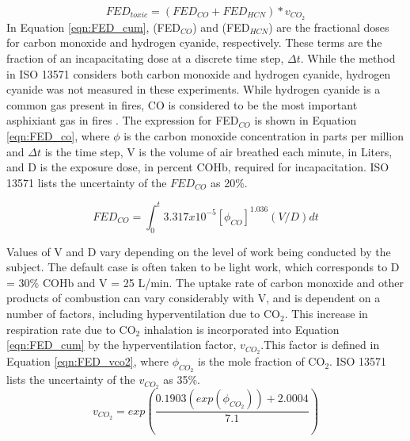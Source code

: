 \documentclass[12pt,oneside]{article}
\begin{document}
\begin{equation}\label{eqn:FED_cum}FED_{toxic}=(FED_{CO}+FED_{HCN})*v_{CO_2}\end{equation}
In Equation \ref{eqn:FED_cum},  (FED$_{CO}$) and  (FED$_{HCN}$) are the fractional doses for carbon monoxide and hydrogen cyanide, respectively. These terms are the fraction of an incapacitating dose at a discrete time step, $\Delta t$. While the method in ISO 13571 considers both carbon monoxide and hydrogen cyanide, hydrogen cyanide was not measured in these experiments. While hydrogen cyanide is a common gas present in fires, CO is considered to be the most important asphixiant gas in fires \cite{SFPE:Purser}. The expression for FED$_{CO}$ is shown in Equation \ref{eqn:FED_co}, where $\phi$ is the carbon monoxide concentration in parts per million and $\Delta t $ is the time step, V is the volume of air breathed each minute, in Liters, and D is the exposure dose, in percent COHb, required for incapacitation. ISO 13571 \cite{ISO13571} lists the uncertainty of the $FED_{CO}$ as 20\%.

\begin{equation}\label{eqn:FED_co}FED_{CO} = \int_{0}^{t} 3.317 x 10^{-5} [\phi_{CO}]^{1.036}(V/D)dt\end{equation}

Values of V and D vary depending on the level of work being conducted by the subject. The default case is often taken to be light work, which corresponds to D = 30\% COHb and V = 25 L/min. The uptake rate of carbon monoxide and other products of combustion can vary considerably with V, and is dependent on a number of factors, including hyperventilation due to CO$_2$. This increase in respiration rate due to CO$_2$ inhalation is incorporated into Equation \ref{eqn:FED_cum} by the hyperventilation factor, $v_{CO_2}$.This factor is defined in Equation \ref{eqn:FED_vco2}, where $\phi_{CO_2}$ is the mole fraction of CO$_2$. ISO 13571 \cite{ISO13571} lists the uncertainty of the $v_{CO_2}$ as 35\%.
\begin{equation}\label{eqn:FED_vco2}v_{CO_2}=exp(\frac{0.1903 (exp(\phi_{CO_2}))+2.0004}{7.1})\end{equation}
\end{document}
